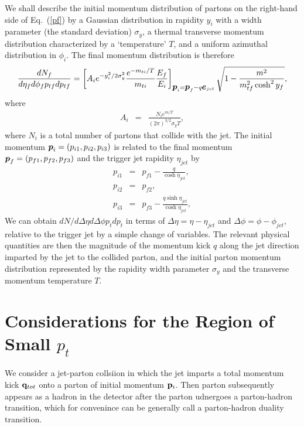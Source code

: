 \documentclass[showpacs,preprintnumbers,amsmath,amssymb,floatfix]{revtex4}
\begin{document}
We shall describe the initial momentum distribution of partons on the
right-hand side of Eq.\ (\ref{pf}) by a Gaussian distribution in
rapidity $y_i$ with a width parameter (the standard deviation)
$\sigma_y$, a thermal transverse momentum distribution characterized
by a `temperature' $T$, and a uniform azimuthal distribution in
$\phi_i$.  
The final momentum distribution is
therefore
\begin{eqnarray}
\label{final}
\frac{dN_f}{d\eta_f d\phi_f p_{tf}dp_{tf}} 
=\left [ A_i e^{-y_i^2/2\sigma_y^2} \frac{ e^{-m_{ti}/T}}{m_{ti}}
\frac{E_f}{E_i} \right ]_{\hbox{\boldmath${p}$}_i=\hbox{\boldmath${p}$}_f-q \hbox{\boldmath${e}$}_{jet}}
\sqrt{1-\frac{m^2}{m_{tf}^2 \cosh^2 y_f}},
\end{eqnarray}
where
\begin{eqnarray}
A_i &=&\frac{N_i e^{m/T}} {(2\pi)^{3/2}\sigma_y T} ,
\end{eqnarray}
where $N_i$ is a total number of partons that collide with the jet.
The initial momentum $\hbox{\boldmath${p}$}_i=(p_{i1},p_{i2},p_{i3})$ is
related to the final momentum $\hbox{\boldmath${p}$}_f=(p_{f1},p_{f2},p_{f3})$ and
the trigger jet rapidity $\eta_{jet}$ by
\begin{subequations}
\begin{eqnarray}
p_{i1}&=&p_{f1}-\frac{q}{\cosh \eta_{jet}},\\
p_{i2}&=&p_{f2},\\
p_{i3}&=&p_{f3}-\frac{q\sinh \eta_{jet}}{\cosh \eta_{jet}},
\end{eqnarray}
\end{subequations}
We can obtain $dN/d\Delta \eta d\Delta \phi p_t dp_t$ in terms of
$\Delta \eta=\eta - \eta_{jet}$ and $\Delta \phi = \phi-\phi_{jet}$,
relative to the trigger jet by a simple change of variables.
 The relevant physical quantities are then the magnitude of the
 momentum kick $q$ along the jet direction imparted by the jet to the
 collided parton, and the initial parton momentum distribution
 represented by the rapidity width parameter $\sigma_y$ and the
 transverse momentum temperature $T$.

\section{Considerations for the Region of Small $p_t$}

We consider a jet-parton collsiion in which the jet imparts a total
momentum kick ${\bf q}_{tot}$ onto a parton of initial momentum ${\bf
p}_i$.  Then parton subsequently appears as a hadron in the detector
after the parton udnergoes a parton-hadron transition, which for
convenince can be generally call a parton-hadron duality transition.
\end{document}
